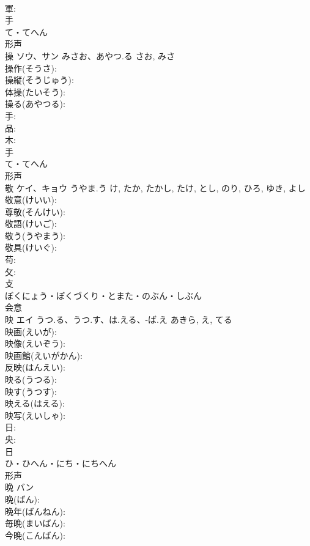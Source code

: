 \documentclass[8pt]{extreport}
\begin{document}
\begin{CJK}{UTF8}{min}
\\	軍: 
\\	手	
\\	て・てへん	
\\	形声 
\\	操	ソウ、サン	みさお、あやつ.る	さお, みさ	
\\	操作(そうさ): 
\\	操縦(そうじゅう): 
\\	体操(たいそう): 
\\	操る(あやつる): 
\\	手: 
\\	品: 
\\	木: 
\\	手	
\\	て・てへん	
\\	形声 
\\	敬	ケイ、キョウ	うやま.う	け, たか, たかし, たけ, とし, のり, ひろ, ゆき, よし	
\\	敬意(けいい): 
\\	尊敬(そんけい): 
\\	敬語(けいご): 
\\	敬う(うやまう): 
\\	敬具(けいぐ): 
\\	苟: 
\\	攵: 
\\	攴	
\\	ぼくにょう・ぼくづくり・とまた・のぶん・しぶん	
\\	会意 
\\	映	エイ	うつ.る、うつ.す、は.える、-ば.え	あきら, え, てる	
\\	映画(えいが): 
\\	映像(えいぞう): 
\\	映画館(えいがかん): 
\\	反映(はんえい): 
\\	映る(うつる): 
\\	映す(うつす): 
\\	映える(はえる): 
\\	映写(えいしゃ): 
\\	日: 
\\	央: 
\\	日	
\\	ひ・ひへん・にち・にちへん	
\\	形声 
\\	晩	バン			
\\	晩(ばん): 
\\	晩年(ばんねん): 
\\	毎晩(まいばん): 
\\	今晩(こんばん): 

\end{CJK}
\end{document}
